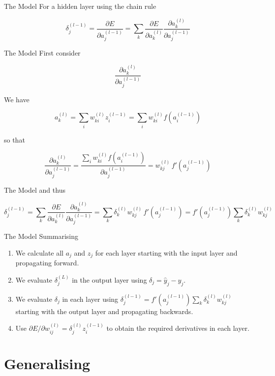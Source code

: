 \documentclass{beamer}
\begin{document}
\begin{frame}[fragile]{The Model}
For a hidden layer using the chain rule

$$
\delta_j^{(l-1)} = \frac{\partial E}{\partial a_j^{(l-1)}} =
\sum_k \frac{\partial E}{\partial a_k^{(l)}}\frac{\partial a_k^{(l)}}{\partial a_j^{(l-1)}}
$$
\end{frame}

\begin{frame}[fragile]{The Model}
First consider

$$
\frac{\partial a_k^{(l)}}{\partial a_j^{(l-1)}}
$$

We have

$$
a_k^{(l)} = \sum_i w_{ki}^{(l)}z_i^{(l-1)} = \sum_i w_{ki}^{(l)} f(a_i^{(l-1)})
$$

so that

$$
\frac{\partial a_k^{(l)}}{\partial a_j^{(l-1)}} =
\frac{\sum_i w_{ki}^{(l)} f(a_i^{(l-1)})}{\partial a_j^{(l-1)}} =
w_{kj}^{(l)}\,f'(a_j^{(l-1)})
$$
\end{frame}

\begin{frame}[fragile]{The Model}
and thus

$$
\delta_j^{(l-1)} =
\sum_k \frac{\partial E}{\partial a_k^{(l)}}\frac{\partial a_k^{(l)}}{\partial a_j^{(l-1)}} =
\sum_k \delta_k^{(l)} w_{kj}^{(l)}\, f'(a_j^{(l-1)}) =
f'(a_j^{(l-1)}) \sum_k \delta_k^{(l)} w_{kj}^{(l)}
$$
\end{frame}

\begin{frame}[fragile]{The Model}
Summarising

\begin{enumerate}
\item
We calculate all $a_j$ and $z_j$ for each layer starting with the
input layer and propagating forward.
\item
We evaluate $\delta_j^{(L)}$ in the output layer using $\delta_j = \hat{y}_j - y_j$.
\item
We evaluate $\delta_j$ in each layer using $\delta_j^{(l-1)} =
f'(a_j^{(l-1)})\sum_k \delta_k^{(l)} w_{kj}^{(l)}$ starting with the output
layer and propagating backwards.
\item
Use $\partial E / \partial w_{ij}^{(l)} = \delta_j^{(l)} z_i^{(l-1)}$ to obtain the
required derivatives in each layer.
\end{enumerate}
\end{frame}

\section{Generalising}
\end{document}
